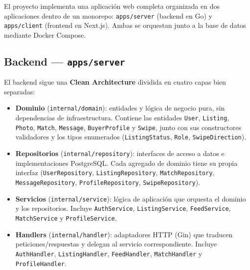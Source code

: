 \documentclass[12pt,a4paper]{article}
\begin{document}
El proyecto implementa una aplicación web completa organizada en dos aplicaciones dentro de un
monorepo: \texttt{apps/server} (backend en Go) y \texttt{apps/client} (frontend en Next.js).
Ambas se orquestan junto a la base de datos mediante Docker Compose.

\subsection{Backend --- \texttt{apps/server}}

El backend sigue una \textbf{Clean Architecture} dividida en cuatro capas bien separadas:

\begin{itemize}
  \item \textbf{Dominio} (\texttt{internal/domain}): entidades y lógica de negocio pura, sin
        dependencias de infraestructura. Contiene las entidades \texttt{User}, \texttt{Listing},
        \texttt{Photo}, \texttt{Match}, \texttt{Message}, \texttt{BuyerProfile} y \texttt{Swipe},
        junto con sus constructores validadores y los tipos enumerados
        (\texttt{ListingStatus}, \texttt{Role}, \texttt{SwipeDirection}).
  \item \textbf{Repositorios} (\texttt{internal/repository}): interfaces de acceso a datos e
        implementaciones PostgreSQL. Cada agregado de dominio tiene su propia interfaz
        (\texttt{UserRepository}, \texttt{ListingRepository}, \texttt{MatchRepository},
        \texttt{MessageRepository}, \texttt{ProfileRepository}, \texttt{SwipeRepository}).
  \item \textbf{Servicios} (\texttt{internal/service}): lógica de aplicación que orquesta el
        dominio y los repositorios. Incluye \texttt{AuthService}, \texttt{ListingService},
        \texttt{FeedService}, \texttt{MatchService} y \texttt{ProfileService}.
  \item \textbf{Handlers} (\texttt{internal/handler}): adaptadores HTTP (Gin) que traducen
        peticiones/respuestas y delegan al servicio correspondiente. Incluye
        \texttt{AuthHandler}, \texttt{ListingHandler}, \texttt{FeedHandler},
        \texttt{MatchHandler} y \texttt{ProfileHandler}.
\end{itemize}
\end{document}
